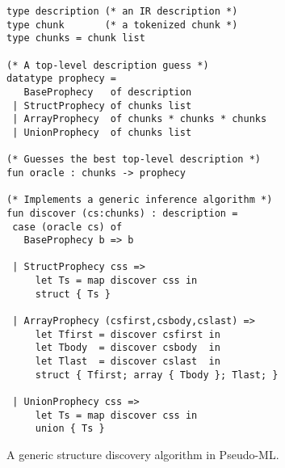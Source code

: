 \begin{figure}
{\small
\begin{verbatim}
type description (* an IR description *)
type chunk       (* a tokenized chunk *)
type chunks = chunk list

(* A top-level description guess *)
datatype prophecy =
   BaseProphecy   of description
 | StructProphecy of chunks list 
 | ArrayProphecy  of chunks * chunks * chunks
 | UnionProphecy  of chunks list

(* Guesses the best top-level description *)
fun oracle : chunks -> prophecy

(* Implements a generic inference algorithm *)
fun discover (cs:chunks) : description =
 case (oracle cs) of
   BaseProphecy b => b

 | StructProphecy css => 
     let Ts = map discover css in
     struct { Ts }

 | ArrayProphecy (csfirst,csbody,cslast) => 
     let Tfirst = discover csfirst in
     let Tbody  = discover csbody  in
     let Tlast  = discover cslast  in
     struct { Tfirst; array { Tbody }; Tlast; }

 | UnionProphecy css => 
     let Ts = map discover css in
     union { Ts }
\end{verbatim}
}
\caption{A generic structure discovery algorithm in Pseudo-ML.} \shrink
\label{fig:structure-discovery}
\end{figure}
